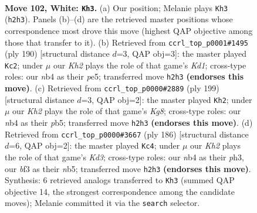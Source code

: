 \documentclass[11pt]{article}
\begin{document}
\clearpage

\begin{figure}[p]\centering
\begin{subfigure}{0.46\textwidth}\centering
\resizebox{\linewidth}{!}{%
\newchessgame
\chessboard[
  setfen={8/7k/8/8/1n1B4/5b2/5P1K/8 w - - 49 102},
  showmover=false,
  pgfstyle=straightmove, color=movearrow, markmove={h2-h3}
]}
\caption{}
\end{subfigure}\hfill
\begin{subfigure}{0.46\textwidth}\centering
\resizebox{\linewidth}{!}{%
\newchessgame
\chessboard[
  setfen={8/2k5/8/3Bp3/8/4bP2/8/3K4 w - - 13 96},
  showmover=false,
  pgfstyle=straightmove, color=movearrow, markmove={d1-c2}
]}
\caption{}
\end{subfigure}
\\[4pt]
\begin{subfigure}{0.46\textwidth}\centering
\resizebox{\linewidth}{!}{%
\newchessgame
\chessboard[
  setfen={8/2b5/1p6/1P1B4/6K1/8/8/6k1 b - - 14 100},
  showmover=false,
  pgfstyle=straightmove, color=movearrow, markmove={g1-h2}
]}
\caption{}
\end{subfigure}\hfill
\begin{subfigure}{0.46\textwidth}\centering
\resizebox{\linewidth}{!}{%
\newchessgame
\chessboard[
  setfen={1k6/8/8/1n6/8/3K3p/7P/6B1 w - - 18 94},
  showmover=false,
  pgfstyle=straightmove, color=movearrow, markmove={d3-c4}
]}
\caption{}
\end{subfigure}
\caption{\textbf{Move 102, White: \texttt{Kh3}.} (a) Our position; Melanie plays \texttt{Kh3} (\texttt{h2h3}). Panels (b)--(d) are the retrieved master positions whose correspondence most drove this move (highest QAP objective among those that transfer to it). (b) Retrieved from \texttt{ccrl\_top\_p0001\#1495} (ply 190) [structural distance $d$=3, QAP obj=3]: the master played \texttt{Kc2}; under $\mu$ our \emph{Kh2} plays the role of that game's \emph{Kd1}; cross-type roles: our \emph{n}b4 as their \emph{p}e5; transferred move \texttt{h2h3} \textbf{(endorses this move)}. (c) Retrieved from \texttt{ccrl\_top\_p0000\#2889} (ply 199) [structural distance $d$=3, QAP obj=2]: the master played \texttt{Kh2}; under $\mu$ our \emph{Kh2} plays the role of that game's \emph{Kg8}; cross-type roles: our \emph{n}b4 as their \emph{p}b5; transferred move \texttt{h2h3} \textbf{(endorses this move)}. (d) Retrieved from \texttt{ccrl\_top\_p0000\#3667} (ply 186) [structural distance $d$=6, QAP obj=2]: the master played \texttt{Kc4}; under $\mu$ our \emph{Kh2} plays the role of that game's \emph{Kd3}; cross-type roles: our \emph{n}b4 as their \emph{p}h3, our \emph{b}f3 as their \emph{n}b5; transferred move \texttt{h2h3} \textbf{(endorses this move)}. Synthesis: 6 retrieved analogs transferred to \texttt{Kh3} (summed QAP objective 14, the strongest correspondence among the candidate moves); Melanie committed it via the \texttt{search} selector.}
\label{fig:thought-m202}
\end{figure}
\end{document}
